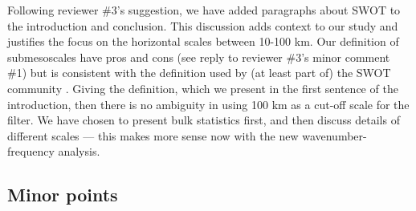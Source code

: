 \documentclass[11pt]{article}
\newcommand{\bdp}{\begin{description}}
\newcommand{\edp}{\end{description}}
\begin{document}
\begin{enumerate}
        \bdp
            Following reviewer \#3's suggestion, we have added paragraphs about SWOT
            to the introduction and conclusion. This discussion adds context to our study
            and justifies the focus on the horizontal scales between 10-100 km. Our definition
            of submesoscales have pros and cons (see reply to reviewer \#3's
            minor comment \#1) but is consistent with the definition used by
            (at least part of) the SWOT community \citep{fu_ferrari2008}. Giving the
            definition, which we present in the first sentence of the introduction,
            then there is no ambiguity in using 100 km as a cut-off scale for the filter.
            We have chosen to present bulk statistics first, and then discuss details of
            different scales --- this makes more sense now with the new wavenumber-frequency
            analysis.
        \edp

\end{enumerate}

\subsection{Minor points}
\end{document}
